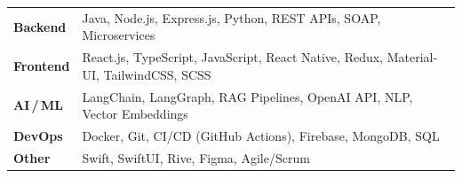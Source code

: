 
\noindent
\begin{tabularx}{\linewidth}{@{} p{2.5cm} X @{}}
  \textbf{Backend}   & Java, Node.js, Express.js, Python, REST APIs, SOAP, Microservices\\[2pt]
  \textbf{Frontend}  & React.js, TypeScript, JavaScript, React Native, Redux,
                       Material-UI, TailwindCSS, SCSS\\[2pt]
  \textbf{AI\,/\,ML} & LangChain, LangGraph, RAG Pipelines, OpenAI API,
                       NLP, Vector Embeddings\\[2pt]
  \textbf{DevOps}    & Docker, Git, CI/CD (GitHub Actions), Firebase, MongoDB, SQL\\[2pt]
  \textbf{Other}     & Swift, SwiftUI, Rive, Figma, Agile/Scrum\\
\end{tabularx}